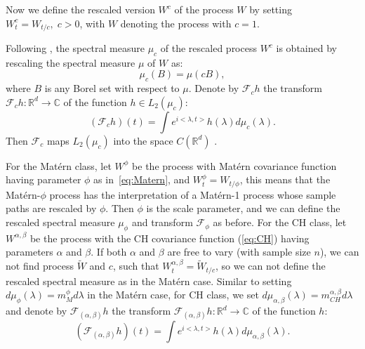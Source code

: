 \documentclass[ejs,noshowframe]{imsart}
\theoremstyle{plain}
\theoremstyle{definition}
\theoremstyle{remark}
\begin{document}
Now we define the rescaled version $W^c$ of the process $W$ by setting $W_t^c=W_{t / c},\; c>0$, with $W$ denoting the process with $c=1$.

 Following  \cite{van2007bayesian}, the spectral measure $\mu_c$ of the rescaled process $W^c$ is obtained by rescaling the spectral measure $\mu$ of $W$ as:
$$
\mu_c(B)=\mu(c B),
$$
where $B$ is any Borel set with respect to $\mu$.
Denote by $\mathcal{F}_c h$ the transform $\mathcal{F}_c h: \mathbb{R}^d \rightarrow \mathbb{C}$ of the function $h \in L_2\left(\mu_c\right)$:
\begin{equation}\label{rescaled matern map}
\left(\mathcal{F}_c h\right)(t)=\int e^{i <\lambda,t>} h(\lambda) d \mu_c(\lambda).
\end{equation}
Then $\mathcal{F}_c$ maps $L_2\left(\mu_c\right)$ into the space $C(\mathbb{R}^d)$ \citep{van2007bayesian}. 

For the Mat\'ern  class, let $W^{\phi}$ be the process with Mat\'ern covariance function having parameter $\phi$ as in~\eqref{eq:Matern}, and $W_t^{\phi}=W_{t/\phi}$, this  means that the Mat\'ern-$\phi$ process has the interpretation of a Mat\'ern-1 process whose sample paths are rescaled by $\phi$. Then $\phi$ is the scale parameter, and we can define the rescaled spectral measure $\mu_\phi$ and transform $\mathcal{F}_\phi$ as before. For the CH class, let $W^{\alpha, \beta}$ be the process with the CH covariance function  (\ref{eq:CH}) having parameters $\alpha$ and $\beta$. If both $\alpha$ and $\beta$ are free to vary (with sample size $n$), we can not find process $\tilde{W}$ and $c$, such that  $W^{\alpha, \beta}_t=\tilde W_{t/c}$, so we can not define the rescaled spectral measure as in the Mat\'ern case. Similar to setting $d \mu_{\phi}(\lambda) = m^{\phi}_M d \lambda $  in the Mat\'ern  case, for CH class, we  set $d \mu_{\alpha,\beta}(\lambda)=m^{\alpha,\beta}_{CH} d\lambda$ and denote by $\mathcal{F}_{(\alpha,\beta)} h$ the transform $\mathcal{F}_{(\alpha,\beta)}  h: \mathbb{R}^d \rightarrow \mathbb{C}$ of the function $h$:
\begin{equation}\label{rescaled CH map}
\left(\mathcal{F}_{(\alpha,\beta)} h\right)(t)=\int e^{i <\lambda,t>} h(\lambda)  d \mu_{\alpha,\beta}(\lambda).
\end{equation}
\end{document}

